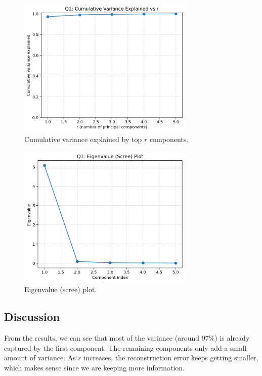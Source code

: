 \documentclass[12pt,a4paper]{article}
\begin{document}
\begin{figure}[H]
    \centering
    \includegraphics[width=0.75\textwidth]{outputs/q1/q1_cumvar_vs_r.png}
    \caption{Cumulative variance explained by top $r$ components.}
\end{figure}

\begin{figure}[H]
    \centering
    \includegraphics[width=0.75\textwidth]{outputs/q1/q1_scree.png}
    \caption{Eigenvalue (scree) plot.}
\end{figure}

\subsection{Discussion}
From the results, we can see that most of the variance (around 97\%) is already captured by the first component. 
The remaining components only add a small amount of variance. 
As $r$ increases, the reconstruction error keeps getting smaller, which makes sense since we are keeping more information.
\end{document}
